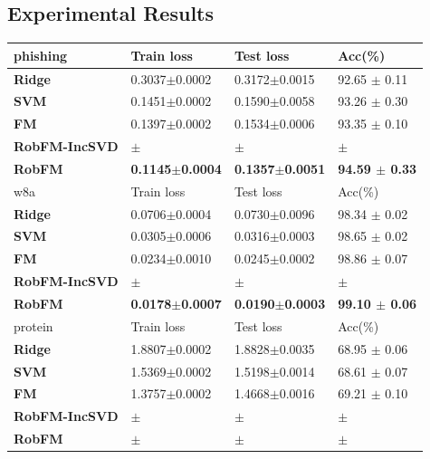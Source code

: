 \documentclass[letterpaper]{article} %
\begin{document}
\subsection{Experimental Results}
\begin{table}
	\begin{tabu} to \textwidth {|X[c]| X[c]| X[c]| X[c]|}
		\hline
		phishing           & Train loss & Test loss & Acc(\%)  \\
		\hline
		\textbf{Ridge} 	 &0.3037$\pm$0.0002  &0.3172$\pm$0.0015  &  92.65 $\pm$ 0.11    \\ \hline
		\textbf{SVM} 	 &0.1451$\pm$0.0002  &0.1590$\pm$0.0058  &  93.26 $\pm$ 0.30    \\ \hline
		\textbf{FM} 	  	&0.1397$\pm$0.0002 &0.1534$\pm$0.0006  &93.35 $\pm$ 0.10   \\ \hline
		\textbf{RobFM-IncSVD} 	 &$\pm$  &$\pm$  &  $\pm$    \\ \hline
		\textbf{RobFM}   	&\textbf{0.1145$\pm$0.0004} &\textbf{0.1357$\pm$0.0051}  &\textbf{94.59 $\pm$ 0.33}   \\ \hline \hline
		w8a               & Train loss & Test loss & Acc(\%) \\
		\hline
		\textbf{Ridge} 	 &0.0706$\pm$0.0004  &0.0730$\pm$0.0096  & 98.34 $\pm$ 0.02    \\ \hline
		\textbf{SVM} 	 &0.0305$\pm$0.0006  &0.0316$\pm$0.0003  & 98.65 $\pm$ 0.02   \\ \hline
		\textbf{FM} 	 &0.0234$\pm$0.0010  &0.0245$\pm$0.0002  & 98.86 $\pm$ 0.07   \\ \hline
		\textbf{RobFM-IncSVD} 	 &$\pm$  &$\pm$  &  $\pm$    \\ \hline
		\textbf{RobFM}   &\textbf{0.0178$\pm$0.0007}  &\textbf{0.0190$\pm$0.0003}  &\textbf{99.10 $\pm$ 0.06}  \\ \hline
		\hline
		protein               & Train loss & Test loss & Acc(\%) \\
		\hline
		\textbf{Ridge} 	 &1.8807$\pm$0.0002  &1.8828$\pm$0.0035  & 68.95 $\pm$ 0.06    \\ \hline
		\textbf{SVM} 	 &1.5369$\pm$0.0002  &1.5198$\pm$0.0014  & 68.61 $\pm$ 0.07    \\ \hline
		\textbf{FM} 	 &1.3757$\pm$0.0002  &1.4668$\pm$0.0016  &69.21 $\pm$ 0.10    \\ \hline
		\textbf{RobFM-IncSVD} 	 &$\pm$  &$\pm$  &  $\pm$    \\ \hline
		\textbf{RobFM}   &\textbf{$\pm$}  &\textbf{$\pm$}  &\textbf{$\pm$}  \\ \hline

\end{tabu}
\end{table}
\end{document}

